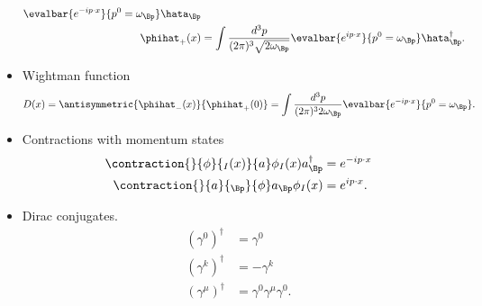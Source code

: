 \begin{itemize}
\begin{equation}
\begin{aligned}
\evalbar{
e^{-i p \cdot x} }{p^0 = \omega_\Bp} \hata_\Bp \\
\phihat_{+}(x) &=
\int \frac{d^3 p}{(2 \pi)^3 \sqrt{2 \omega_\Bp}}
\evalbar{
e^{i p \cdot x} }{p^0 = \omega_\Bp} \hata^\dagger_\Bp.
\end{aligned}
\end{equation}
\item Wightman function
\begin{equation}\label{eqn:usefulFormulas:640}
D(x)
= \antisymmetric{\phihat_{-}(x)}{\phihat_{+}(0)}
=
\int \frac{d^3 p}{(2 \pi)^3 2 \omega_\Bp}
\evalbar{ e^{-i p \cdot x} }{p^0 = \omega_\Bp}.
\end{equation}
\item Contractions with momentum states
\begin{equation}\label{eqn:usefulFormulas:660}
\begin{aligned}
\contraction{}{\phi}{{}_I(x)}{a}
\phi_I(x) a^\dagger_{\Bp}
&= e^{-i p \cdot x} \\
\contraction{}{a}{{}_\Bp}{\phi}
a_\Bp \phi_I(x)
&= e^{i p \cdot x}.
\end{aligned}
\end{equation}
\item Dirac conjugates.
\begin{equation}\label{eqn:usefulFormulas:680}
\begin{aligned}
(\gamma^0)^\dagger &= \gamma^0 \\
(\gamma^k)^\dagger &= - \gamma^k \\
(\gamma^\mu)^\dagger &= \gamma^0 \gamma^\mu \gamma^0.
\end{aligned}
\end{equation}

\end{itemize}
